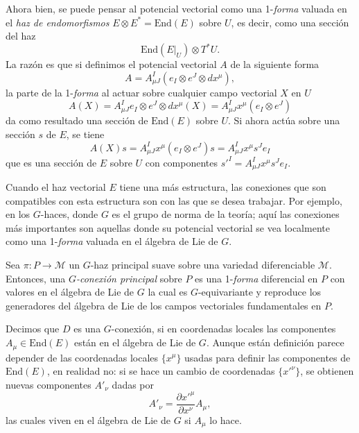 Ahora bien, se puede pensar al potencial vectorial como una 1-\emph{forma} valuada en el \emph{haz de endomorfismos} $E \otimes E^{*} = \mathrm{End}(E)$ sobre $U$, es decir, como una secci\'{o}n del haz $$\mathrm{End}(E|_{U}) \otimes T^{*}U.$$ La raz\'{o}n es que si definimos el potencial vectorial $A$ de la siguiente forma
%
\begin{equation}
A = A^{I}_{\mu J} (e_{I} \otimes e^{J} \otimes dx^{\mu}),
\end{equation}
%
la parte de la 1-\emph{forma} al actuar sobre cualquier campo vectorial $X$ en $U$ $$A(X) = A^{I}_{\mu J} e_{I} \otimes e^{J} \otimes dx^{\mu}(X) = A^{I}_{\mu J} x^{\mu} (e_{I} \otimes e^{J})$$ da como resultado una secci\'{o}n de $\mathrm{End}(E)$ sobre $U$. Si ahora act\'{u}a sobre una secci\'{o}n $s$ de $E$, se tiene $$A(X)s = A^{I}_{\mu J} x^{\mu} (e_{I} \otimes e^{J}) s = A^{I}_{\mu J} x^{\mu} s^{J} e_{I}$$ que es una secci\'{o}n de $E$ sobre $U$ con componentes $s'^{I} = A^{I}_{\mu J} x^{\mu} s^{J} e_{I}$.

Cuando el haz vectorial $E$ tiene una m\'{a}s estructura, las conexiones que son compatibles con esta estructura son con las que se desea trabajar. Por ejemplo, en los $G$-haces, donde $G$ es el grupo de norma de la teor\'{i}a; aqu\'{i} las conexiones m\'{a}s importantes son aquellas donde su potencial vectorial se vea localmente como una 1-\emph{forma} valuada en el \'{a}lgebra de Lie de $G$.

Sea $\pi: P \rightarrow \mathcal{M}$ un $G$-haz principal suave sobre una variedad diferenciable $\mathcal{M}$. Entonces, una \emph{$G$-conexi\'{o}n principal} sobre $P$ es una 1-\emph{forma} diferencial en $P$ con valores en el \'{a}lgebra de Lie de $G$ la cual es $G$-equivariante y reproduce los generadores del \'{a}lgebra de Lie de los campos vectoriales fundamentales en $P$.

Decimos que $D$ es una $G$-conexi\'{o}n, si en coordenadas locales las componentes $A_{\mu} \in \mathrm{End}(E)$ est\'{a}n en el \'{a}lgebra de Lie de $G$. Aunque est\'{a}n definici\'{o}n parece depender de las coordenadas locales $\{x^{\mu}\}$ usadas para definir las componentes de $\mathrm{End}(E)$, en realidad no: si se hace un cambio de coordenadas $\{x'^{\nu}\}$, se obtienen nuevas componentes $A'_{\nu}$ dadas por
%
\begin{equation*}
A'_{\nu} = \frac{\partial x'^{\mu}}{\partial x^{\nu}} A_{\mu},
\end{equation*}
%
las cuales viven en el \'{a}lgebra de Lie de $G$ si $A_{\mu}$ lo hace.

